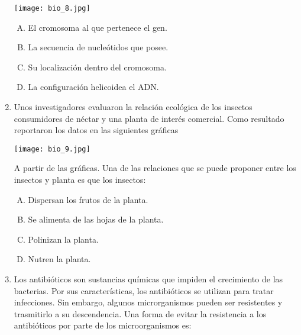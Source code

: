 \begin{enumerate}
\begin{flushleft}
\texttt{[image: bio\_8.jpg]} 
\end{flushleft}

\begin{enumerate}[(A)]
\item El  cromosoma  al  que pertenece  el gen.
\item La secuencia de  nucleótidos  que posee.
\item Su  localización dentro   del cromosoma.
\item La  configuración  helicoidea el ADN.	
\end{enumerate}


\item Unos   investigadores  evaluaron  la relación ecológica de los insectos consumidores de néctar y una planta de interés comercial.  Como resultado  reportaron los datos  en las siguientes gráficas \label{bio-15}

\begin{flushleft}
\texttt{[image: bio\_9.jpg]} 
\end{flushleft}

A partir   de las  gráficas.  Una de las  relaciones  que  se puede  proponer  entre los insectos y planta  es   que los insectos:

\begin{enumerate}[(A)]
\item Dispersan los frutos de la planta.
\item Se alimenta de las hojas de la planta.
\item Polinizan la  planta.
\item Nutren la   planta.
\end{enumerate}


\item Los  antibióticos   son sustancias  químicas  que impiden  el  crecimiento de   las  bacterias.  Por  sus  características, los  antibióticos  se   utilizan   para tratar   infecciones.  Sin  embargo, algunos  microrganismos  pueden   ser  resistentes  y trasmitirlo   a  su descendencia.  Una  forma  de evitar  la  resistencia a los antibióticos   por parte   de los  microorganismos   es: \label{bio-16}



\end{enumerate}
